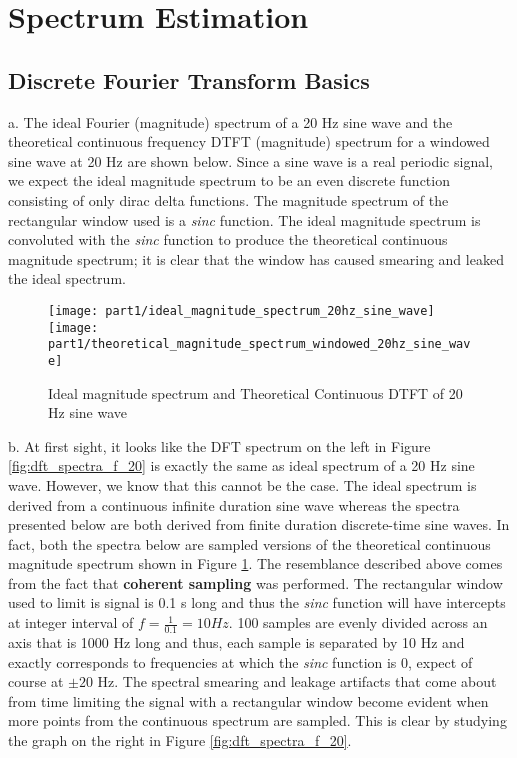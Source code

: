 \section{Spectrum Estimation}

\subsection{Discrete Fourier Transform Basics}\label{sec:dft_basics}

\noindent{}a. The ideal Fourier (magnitude) spectrum of a 20 Hz sine wave and the theoretical continuous frequency DTFT (magnitude) spectrum for a windowed sine wave at 20 Hz are shown below. Since a sine wave is a real periodic signal, we expect the ideal magnitude spectrum to be an even discrete function consisting of only dirac delta functions. The magnitude spectrum of the rectangular window used is a \textit{sinc} function. The ideal magnitude spectrum is convoluted with the \textit{sinc} function to produce the theoretical continuous magnitude spectrum; it is clear that the window has caused smearing and leaked the ideal spectrum.

\begin{figure}[H]
\centering{}
\texttt{[image: part1/ideal\_magnitude\_spectrum\_20hz\_sine\_wave]}
\texttt{[image: part1/theoretical\_magnitude\_spectrum\_windowed\_20hz\_sine\_wave]}
\caption{Ideal magnitude spectrum and Theoretical Continuous DTFT of 20 Hz sine wave}
\label{fig:ideal_and_theoretical_spectra_f_20}
\end{figure}

\noindent{}b. At first sight, it looks like the DFT spectrum on the left in Figure \ref{fig:dft_spectra_f_20} is exactly the same as ideal spectrum of a 20 Hz sine wave. However, we know that this cannot be the case. The ideal spectrum is derived from a continuous infinite duration sine wave whereas the spectra presented below are both derived from finite duration discrete-time sine waves. In fact, both the spectra below are sampled versions of the theoretical continuous magnitude spectrum shown in Figure \ref{fig:ideal_and_theoretical_spectra_f_20}. The resemblance described above comes from the fact that \textbf{coherent sampling} was performed. The rectangular window used to limit is signal is 0.1 s long and thus the \textit{sinc} function will have intercepts at integer interval of $f=\frac{1}{0.1}=10 Hz$. 100 samples are evenly divided across an axis that is 1000 Hz long and thus, each sample is separated by 10 Hz and exactly corresponds to frequencies at which the \textit{sinc} function is 0, expect of course at $\pm 20$ Hz. The spectral smearing and leakage artifacts that come about from time limiting the signal with a rectangular window become evident when more points from the continuous spectrum are sampled. This is clear by studying the graph on the right in Figure \ref{fig:dft_spectra_f_20}.

